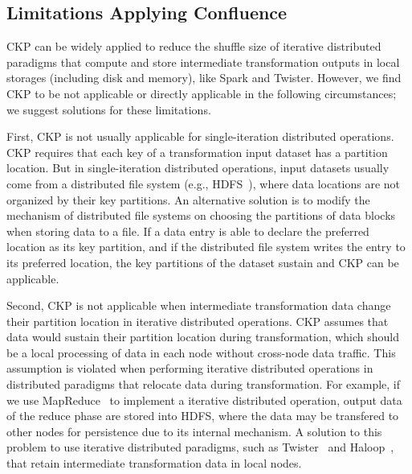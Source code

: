 \documentclass[10pt,journal,compsoc]{IEEEtran}
\begin{document}
\subsection{Limitations Applying Confluence}\label{section:limitation}
CKP can be widely applied to reduce the shuffle size of iterative
distributed paradigms that compute and store intermediate transformation outputs in
local storages (including disk and memory), like Spark and Twister.
However, we find CKP to be not applicable or directly applicable in the following 
circumstances; we suggest solutions for these limitations.

First, CKP is not usually applicable for single-iteration distributed operations. 
CKP requires that each key of a transformation input dataset has a partition location. 
But in single-iteration distributed operations, input datasets usually
come from a distributed file system (e.g., HDFS~\cite{shvachko2010hadoop}), where data locations are not organized by their key partitions. 
An alternative solution is to modify the mechanism of distributed file
systems on choosing the
partitions of data blocks when storing data to a file.
If a data entry is able to declare the preferred location as its key partition, and if the distributed file system writes the entry to its preferred location, the key partitions of the dataset sustain and CKP can be applicable. 

Second, CKP is not applicable when intermediate transformation data change
their partition location in iterative distributed operations. 
CKP assumes that data would sustain their partition location during 
transformation, which should be a local processing of data in each node 
without cross-node data traffic.
This assumption is violated when performing iterative distributed operations
in distributed paradigms that relocate data during transformation. 
For example, if we use MapReduce~\cite{dean2008mapreduce} to implement a iterative distributed operation, output data of the reduce phase are 
stored into HDFS, where the data may be transfered to other nodes for persistence due to its internal mechanism. 
A solution to this problem to use iterative distributed paradigms, such as Twister~\cite{ekanayake2010twister} and Haloop~\cite{bu2010haloop}, that retain intermediate transformation data in local nodes. 
\end{document}
